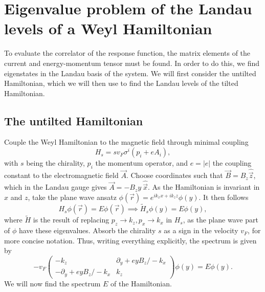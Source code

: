 \section{Eigenvalue problem of the Landau levels of a Weyl Hamiltonian}
To evaluate the correlator of the response function, the matrix elements of the current and energy-momentum tensor must be found.
In order to do this, we find eigenstates in the Landau basis of the system.
We will first consider the untilted Hamiltonian, which we will then use to find the Landau levels of the tilted Hamiltonian.

\subsection{The untilted Hamiltonian}
\label{sec:ll-notilt}
Couple the Weyl Hamiltonian to the magnetic field through minimal coupling
\begin{equation}
  \label{eq:weyl-hamil}
  H_s = s v_F \sigma^i \left( p_i + e A_i \right),
\end{equation}
with $s$ being the chirality, $p_i$ the momentum operator, and $e = |e|$ the coupling constant to the electromagnetic field $\vec{A}$.
Choose coordinates such that $\vec{B} = B_z \hat{\vec{z}}$, which in the Landau gauge gives $\vec{A} = -B_{z}y \: \hat{\vec{x}}$.
As the Hamiltonian is invariant in $x$ and $z$, take the plane wave ansatz $\phi(\vec{r}) = e^{ik_x x + i k_z z} \phi (y)$.
It then follows
\begin{equation}
  H_s \phi(\vec{r}) = E \phi(\vec{r}) \implies \tilde{H}_s \phi(y)  = E \phi(y),
\end{equation}
where $\tilde{H}$ is the result of replacing $p_z \to  k_z, p_x\to   k_x$ in $H_s$, as the plane wave part of $\phi $ have these eigenvalues.
Absorb the chirality $s$ as a sign in the velocity $v_F$, for more concise notation.
Thus, writing everything explicitly, the spectrum is given by
\begin{equation}
  \label{eq:25}
  -  v_F
  \begin{pmatrix}
    - k_z & \partial _y + e y B_{z} /   - k_x\\
    -\partial _y + e y B_{z} /  -k_x & k_z
  \end{pmatrix}
  \phi(y)  = E\phi(y).
\end{equation}
We will now find the spectrum $E$ of the Hamiltonian.

